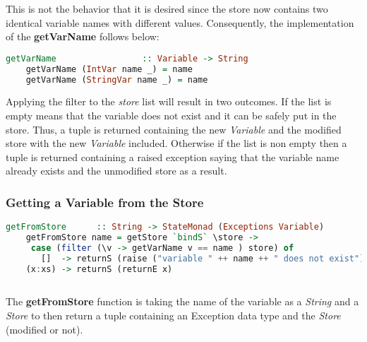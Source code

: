 \documentclass[a4paper, onecolumn]{article}
\begin{document}
    \noindent This is not the behavior that it is desired since the store now contains two identical variable names with different values. Consequently, the implementation of the \textbf{getVarName} follows below: 
    
    \begin{tcolorbox}
    \begin{lstlisting}[language=Haskell] 
    getVarName                 :: Variable -> String
    getVarName (IntVar name _) = name
    getVarName (StringVar name _) = name
    \end{lstlisting}
    \end{tcolorbox}
    
    \noindent Applying the filter to the \textit{store} list will result in two outcomes. If the list is empty means that the variable does not exist and it can be safely put in the store. Thus, a tuple is returned containing the new \textit{Variable} and the modified store with the new \textit{Variable} included. Otherwise if the list is non empty then a tuple is returned containing a raised exception saying that the variable name already exists and the unmodified store as a result.
    
    \subsubsection{Getting a Variable from the Store}
    
    \begin{tcolorbox}
    \begin{lstlisting}[language=Haskell] 
    getFromStore      :: String -> StateMonad (Exceptions Variable)
    getFromStore name = getStore `bindS` \store -> 
     case (filter (\v -> getVarName v == name ) store) of 
       []  -> returnS (raise ("variable " ++ name ++ " does not exist"))
    (x:xs) -> returnS (returnE x)
    
    \end{lstlisting}
    \end{tcolorbox}
    
    \noindent The \textbf{getFromStore} function is taking the name of the variable as a \textit{String} and a \textit{Store} to then return a tuple containing an Exception data type and the \textit{Store} (modified or not).
    
    
    
    
    
\end{document}
